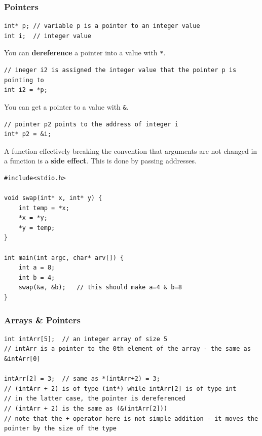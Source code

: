 \documentclass[a4paper,11pt]{article}
\begin{document}
\subsubsection{Pointers}
\begin{verbatim}
int* p; // variable p is a pointer to an integer value
int i;  // integer value
\end{verbatim}

You can \textbf{dereference} a pointer into a value with \verb|*|. 
\begin{verbatim}
// ineger i2 is assigned the integer value that the pointer p is pointing to 
int i2 = *p;
\end{verbatim}
 
You can get a pointer to a value with \verb|&|. 
\begin{verbatim}
// pointer p2 points to the address of integer i
int* p2 = &i;
\end{verbatim}

A function effectively breaking the convention that arguments are not changed in a function is a \textbf{side effect}. 
This is done by passing addresses.
\begin{verbatim}
#include<stdio.h>

void swap(int* x, int* y) {
    int temp = *x; 
    *x = *y; 
    *y = temp;
}

int main(int argc, char* arv[]) {
    int a = 8; 
    int b = 4;
    swap(&a, &b);   // this should make a=4 & b=8
}
\end{verbatim}

\subsubsection{Arrays \& Pointers}
\begin{verbatim}
int intArr[5];  // an integer array of size 5
// intArr is a pointer to the 0th element of the array - the same as &intArr[0]

intArr[2] = 3;  // same as *(intArr+2) = 3;
// (intArr + 2) is of type (int*) while intArr[2] is of type int
// in the latter case, the pointer is dereferenced
// (intArr + 2) is the same as (&(intArr[2]))
// note that the + operator here is not simple addition - it moves the pointer by the size of the type
\end{verbatim}
\end{document}
